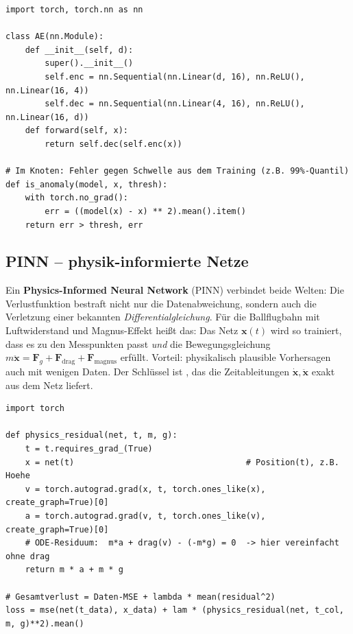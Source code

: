 \begin{lstlisting}[style=py,caption={Autoencoder zur Anomalieerkennung (PyTorch)}]
import torch, torch.nn as nn

class AE(nn.Module):
    def __init__(self, d):
        super().__init__()
        self.enc = nn.Sequential(nn.Linear(d, 16), nn.ReLU(), nn.Linear(16, 4))
        self.dec = nn.Sequential(nn.Linear(4, 16), nn.ReLU(), nn.Linear(16, d))
    def forward(self, x):
        return self.dec(self.enc(x))

# Im Knoten: Fehler gegen Schwelle aus dem Training (z.B. 99%-Quantil)
def is_anomaly(model, x, thresh):
    with torch.no_grad():
        err = ((model(x) - x) ** 2).mean().item()
    return err > thresh, err
\end{lstlisting}

\subsection{PINN -- physik-informierte Netze}
Ein \textbf{Physics-Informed Neural Network} (PINN) verbindet beide Welten: Die
Verlustfunktion bestraft nicht nur die Datenabweichung, sondern auch die
Verletzung einer bekannten \emph{Differentialgleichung}. Für die Ballflugbahn
mit Luftwiderstand und Magnus-Effekt heißt das: Das Netz $\bm{x}(t)$ wird so
trainiert, dass es zu den Messpunkten passt \emph{und} die Bewegungsgleichung
$m\ddot{\bm{x}} = \bm{F}_g + \bm{F}_{\text{drag}} + \bm{F}_{\text{magnus}}$
erfüllt. Vorteil: physikalisch plausible Vorhersagen auch mit wenigen Daten.
Der Schlüssel ist , das die Zeitableitungen
$\dot{\bm{x}}, \ddot{\bm{x}}$ exakt aus dem Netz liefert.

\begin{lstlisting}[style=py,caption={PINN-Residuum fuer eine Bewegungsgleichung (PyTorch)}]
import torch

def physics_residual(net, t, m, g):
    t = t.requires_grad_(True)
    x = net(t)                                   # Position(t), z.B. Hoehe
    v = torch.autograd.grad(x, t, torch.ones_like(x), create_graph=True)[0]
    a = torch.autograd.grad(v, t, torch.ones_like(v), create_graph=True)[0]
    # ODE-Residuum:  m*a + drag(v) - (-m*g) = 0  -> hier vereinfacht ohne drag
    return m * a + m * g

# Gesamtverlust = Daten-MSE + lambda * mean(residual^2)
loss = mse(net(t_data), x_data) + lam * (physics_residual(net, t_col, m, g)**2).mean()
\end{lstlisting}

